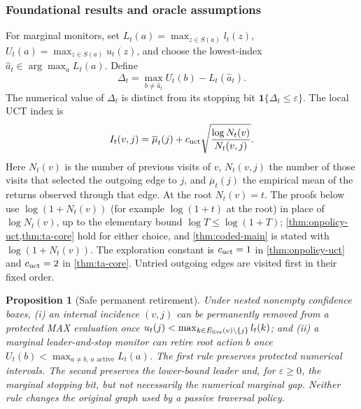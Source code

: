 \documentclass{article}
\theoremstyle{plain}
\newtheorem{proposition}[theorem]{Proposition}
\theoremstyle{definition}
\begin{document}
\subsubsection{Foundational results and oracle assumptions}
For marginal monitors, set $L_t(a)=\max_{z\in S(a)}l_t(z)$,
$U_t(a)=\max_{z\in S(a)}u_t(z)$, and choose the lowest-index
$\hat a_t\in\arg\max_aL_t(a)$. Define
\begin{equation}
 \Delta_t=\max_{b\ne\hat a_t}U_t(b)-L_t(\hat a_t).
 \label{eq:cert-gap}
\end{equation}
The numerical value of $\Delta_t$ is distinct from its stopping bit
$\mathbf1\{\Delta_t\le\varepsilon\}$. The local UCT index is
\begin{equation}
 I_t(v,j)=\overline\mu_t(j)+c_{\rm uct}
                    \sqrt{\frac{\log N_t(v)}{N_t(v,j)}}.
 \label{eq:uct-index}
\end{equation}
Here $N_t(v)$ is the number of previous visits of $v$, $N_t(v,j)$ the
number of those visits that selected the outgoing edge to $j$, and
$\overline\mu_t(j)$ the empirical mean of the returns observed through
that edge. At the root $N_t(v)=t$. The proofs below use
$\log(1+N_t(v))$ (for example $\log(1+t)$ at the root) in place of
$\log N_t(v)$, up to the elementary bound $\log T\le\log(1+T)$;
\cref{thm:onpolicy-uct,thm:ta-core} hold for either choice, and
\cref{thm:coded-main} is stated with $\log(1+N_t(v))$. The
exploration constant is $c_{\rm uct}=1$ in
\cref{thm:onpolicy-uct} and $c_{\rm uct}=2$ in \cref{thm:ta-core}.
Untried outgoing edges are visited first in their fixed order.

\begin{proposition}[Safe permanent retirement]
\label{prop:uct-coupling}\label{prop:ta-coupled}\label{thm:protected-pruning}
\label{thm:decision-retirement}\label{thm:tombstones}
Under nested nonempty confidence boxes, (i) an internal incidence $(v,j)$
can be permanently removed from a protected MAX evaluation once
$u_t(j)<\max_{k\in E_{\rm live}(v)\setminus\{j\}}l_t(k)$;
and (ii) a marginal leader-and-stop monitor can retire root action $b$
once $U_t(b)<\max_{a\ne b,\,a\text{ active}}L_t(a)$.
The first rule preserves protected numerical intervals. The second
preserves the lower-bound leader and, for $\varepsilon\ge0$, the marginal stopping bit, but not
necessarily the numerical marginal gap. Neither rule changes the
original graph used by a passive traversal policy.
\end{proposition}

\end{document}
